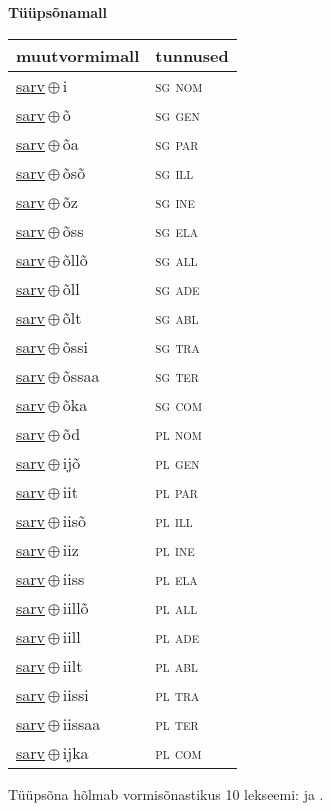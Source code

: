 

\vspace{3.5em}
\noindent \begin{minipage}{\textwidth}
\noindent \textbf{Tüüpsõnamall \,}\\

\begin{sideways}
\begin{tabular}{l l}
muutvormimall & tunnused \\
\hline
\underline{sarv}\,$\oplus$\,i & \textsc{ sg nom } \\
\underline{sarv}\,$\oplus$\,õ & \textsc{ sg gen } \\
\underline{sarv}\,$\oplus$\,õa & \textsc{ sg par } \\
\underline{sarv}\,$\oplus$\,õsõ & \textsc{ sg ill } \\
\underline{sarv}\,$\oplus$\,õz & \textsc{ sg ine } \\
\underline{sarv}\,$\oplus$\,õss & \textsc{ sg ela } \\
\underline{sarv}\,$\oplus$\,õllõ & \textsc{ sg all } \\
\underline{sarv}\,$\oplus$\,õll & \textsc{ sg ade } \\
\underline{sarv}\,$\oplus$\,õlt & \textsc{ sg abl } \\
\underline{sarv}\,$\oplus$\,õssi & \textsc{ sg tra } \\
\underline{sarv}\,$\oplus$\,õssaa & \textsc{ sg ter } \\
\underline{sarv}\,$\oplus$\,õka & \textsc{ sg com } \\
\underline{sarv}\,$\oplus$\,õd & \textsc{ pl nom } \\
\underline{sarv}\,$\oplus$\,ijõ & \textsc{ pl gen } \\
\underline{sarv}\,$\oplus$\,iit & \textsc{ pl par } \\
\underline{sarv}\,$\oplus$\,iisõ & \textsc{ pl ill } \\
\underline{sarv}\,$\oplus$\,iiz & \textsc{ pl ine } \\
\underline{sarv}\,$\oplus$\,iiss & \textsc{ pl ela } \\
\underline{sarv}\,$\oplus$\,iillõ & \textsc{ pl all } \\
\underline{sarv}\,$\oplus$\,iill & \textsc{ pl ade } \\
\underline{sarv}\,$\oplus$\,iilt & \textsc{ pl abl } \\
\underline{sarv}\,$\oplus$\,iissi & \textsc{ pl tra } \\
\underline{sarv}\,$\oplus$\,iissaa & \textsc{ pl ter } \\
\underline{sarv}\,$\oplus$\,ijka & \textsc{ pl com } \\
\end{tabular}
\end{sideways}
\label{tab:tüüpsõnamall-sarvi}

\end{minipage}

 
\vspace{1em}
\noindent Tüüpsõna hõlmab vormisõnastikus 10 lekseemi:  ja .
